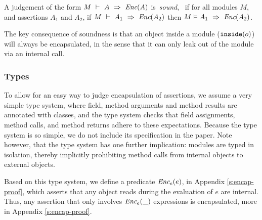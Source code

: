 \begin{definition}
\label{lem:encap-soundness}
A judgement of the form $M\ \vdash\ A\ \Rightarrow\ \textit{Enc}(A)$  is\  \emph{sound}, \ if 
for all modules $M$, and assertions $A_1$ and $A_2$, if 
$M\ \vdash\ A_1\ \Rightarrow\ \textit{Enc}(A_2)$ then $M \vDash A_1\ \Rightarrow\ \textit{Enc}(A_2)$.
\end{definition}

\noindent 
The key consequence of soundness is that an object inside a
  module ($\texttt{inside}( o )$) 
  will always be encapsulated, in the sense that it can only leak out
  of the module via an internal call.





\subsubsection{Types}
\label{types}

To allow for an easy way to judge encapsulation of
assertions, we assume a very simple type system, where field, method arguments
and method results are annotated with classes, and the type system checks 
that field assignments, method calls, and method returns adhere to these expectations.
Because the type system is so simple, we do not include its specification in the paper.
Note however, that the type system has one further implication: modules are typed 
in isolation, thereby implicitly prohibiting
method calls from internal objects to external objects. 

Based on this type system, we define a predicate $\textit{Enc$_e$}(e)$, in Appendix \ref{s:encap-proof},
which asserts that any object reads during the evaluation of $e$ are internal.
Thus, any assertion that only involves $\textit{Enc$_e$}(\_)$ expressions is encapsulated, more in Appendix \ref{s:encap-proof}.


